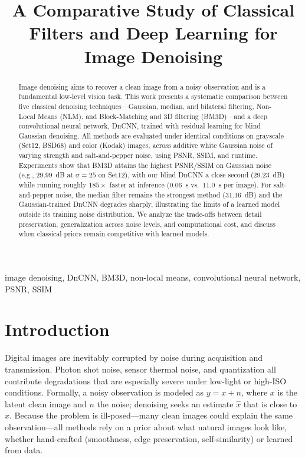 \documentclass[conference]{IEEEtran}
\begin{document}
\title{A Comparative Study of Classical Filters and Deep Learning for Image Denoising}

\author{}

\maketitle

\begin{abstract}
Image denoising aims to recover a clean image from a noisy observation and is a
fundamental low-level vision task. This work presents a systematic comparison
between five classical denoising techniques---Gaussian, median, and bilateral
filtering, Non-Local Means (NLM), and Block-Matching and 3D filtering (BM3D)---and
a deep convolutional neural network, DnCNN, trained with residual learning for
blind Gaussian denoising. All methods are evaluated under identical conditions on
grayscale (Set12, BSD68) and color (Kodak) images, across additive white Gaussian
noise of varying strength and salt-and-pepper noise, using PSNR, SSIM, and runtime.
Experiments show that BM3D attains the highest PSNR/SSIM on Gaussian noise
(e.g., 29.99~dB at $\sigma=25$ on Set12), with our blind DnCNN a close second
(29.23~dB) while running roughly $185\times$ faster at inference (0.06~s vs.\
11.0~s per image). For salt-and-pepper noise, the median filter remains the
strongest method (31.16~dB) and the Gaussian-trained DnCNN degrades sharply,
illustrating the limits of a learned model outside its training noise
distribution. We analyze the trade-offs between detail preservation,
generalization across noise levels, and computational cost, and discuss when
classical priors remain competitive with learned models.
\end{abstract}

\begin{IEEEkeywords}
image denoising, DnCNN, BM3D, non-local means, convolutional neural network, PSNR, SSIM
\end{IEEEkeywords}

\section{Introduction}
Digital images are inevitably corrupted by noise during acquisition and
transmission. Photon shot noise, sensor thermal noise, and quantization all
contribute degradations that are especially severe under low-light or
high-ISO conditions. Formally, a noisy observation is modeled as $y = x + n$,
where $x$ is the latent clean image and $n$ the noise; denoising seeks an
estimate $\hat{x}$ that is close to $x$. Because the problem is ill-posed---many
clean images could explain the same observation---all methods rely on a prior
about what natural images look like, whether hand-crafted (smoothness, edge
preservation, self-similarity) or learned from data.
\end{document}

